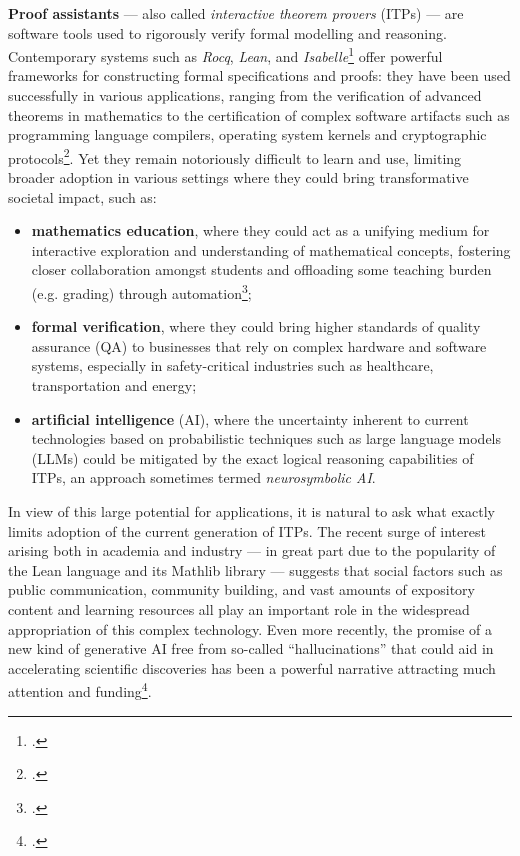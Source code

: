 \documentclass[12pt,draftproposal]{msca-pf}
\begin{document}
\textbf{Proof assistants} --- also called \emph{interactive theorem provers} (ITPs) --- are software
tools used to rigorously verify formal modelling and reasoning. Contemporary systems such as
\emph{Rocq}, \emph{Lean}, and
\emph{Isabelle}\footcite{the_rocq_development_team_2025_15149629,10.1007/978-3-030-79876-5_37,nipkow2002isabelle}
offer powerful frameworks for constructing formal specifications and proofs: they have been used
successfully in various applications, ranging from the verification of advanced theorems in
mathematics to the certification of complex software artifacts such as programming language
compilers, operating system kernels and cryptographic
protocols\footcite{gonthierFormalProofFour2008,leroyFormalVerificationRealistic2009,kleinSeL4FormalVerification2009,Barthe2014}.
Yet they remain notoriously difficult to learn and use, limiting broader adoption in various
settings where they could bring transformative societal impact, such as:
\begin{itemize}
    \item \textbf{mathematics education}, where they could act as a unifying medium for interactive
    exploration and understanding of mathematical concepts, fostering closer collaboration amongst
    students and offloading some teaching burden (e.g. grading) through
    automation\footcite{minhResearchReportProof2024};
    \item \textbf{formal verification}, where they could bring higher standards of quality assurance
    (QA) to businesses that rely on complex hardware and software systems, especially in
    safety-critical industries such as healthcare, transportation and energy;
    \item \textbf{artificial intelligence} (AI), where the uncertainty inherent to current
    technologies based on probabilistic techniques such as large language models (LLMs) could be
    mitigated by the exact logical reasoning capabilities of ITPs, an approach sometimes termed
    \emph{neurosymbolic AI}.
\end{itemize}
In view of this large potential for applications, it is natural to ask what exactly limits adoption
of the current generation of ITPs. The recent surge of interest arising both in academia and
industry --- in great part due to the popularity of the Lean language and its Mathlib library ---
suggests that social factors such as public communication, community building, and vast amounts of
expository content and learning resources all play an important role in the widespread appropriation
of this complex technology. Even more recently, the promise of a new kind of generative AI free from
so-called ``hallucinations'' that could aid in accelerating scientific discoveries has been a
powerful narrative attracting much attention and funding\footcite{metzMathPathChatbots2024}.
\end{document}
